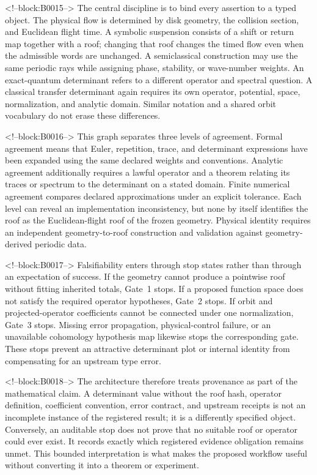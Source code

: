 \documentclass[11pt,a4paper]{article}
\begin{document}
<!--block:B0015-->
The central discipline is to bind every assertion to a typed object. The physical flow is determined by disk geometry, the collision section, and Euclidean flight time. A symbolic suspension consists of a shift or return map together with a roof; changing that roof changes the timed flow even when the admissible words are unchanged. A semiclassical construction may use the same periodic rays while assigning phase, stability, or wave-number weights. An exact-quantum determinant refers to a different operator and spectral question. A classical transfer determinant again requires its own operator, potential, space, normalization, and analytic domain. Similar notation and a shared orbit vocabulary do not erase these differences.

<!--block:B0016-->
This graph separates three levels of agreement. Formal agreement means that Euler, repetition, trace, and determinant expressions have been expanded using the same declared weights and conventions. Analytic agreement additionally requires a lawful operator and a theorem relating its traces or spectrum to the determinant on a stated domain. Finite numerical agreement compares declared approximations under an explicit tolerance. Each level can reveal an implementation inconsistency, but none by itself identifies the roof as the Euclidean-flight roof of the frozen geometry. Physical identity requires an independent geometry-to-roof construction and validation against geometry-derived periodic data.

<!--block:B0017-->
Falsifiability enters through stop states rather than through an expectation of success. If the geometry cannot produce a pointwise roof without fitting inherited totals, Gate~1 stops. If a proposed function space does not satisfy the required operator hypotheses, Gate~2 stops. If orbit and projected-operator coefficients cannot be connected under one normalization, Gate~3 stops. Missing error propagation, physical-control failure, or an unavailable cohomology hypothesis map likewise stops the corresponding gate. These stops prevent an attractive determinant plot or internal identity from compensating for an upstream type error.

<!--block:B0018-->
The architecture therefore treats provenance as part of the mathematical claim. A determinant value without the roof hash, operator definition, coefficient convention, error contract, and upstream receipts is not an incomplete instance of the registered result; it is a differently specified object. Conversely, an auditable stop does not prove that no suitable roof or operator could ever exist. It records exactly which registered evidence obligation remains unmet. This bounded interpretation is what makes the proposed workflow useful without converting it into a theorem or experiment.
\end{document}
